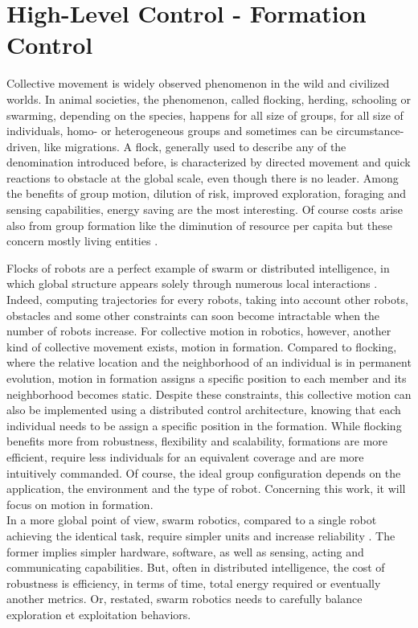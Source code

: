 \documentclass[a4paper, 12pt]{report}
\begin{document}
\section{High-Level Control - Formation Control}
Collective movement is widely observed phenomenon in the wild and civilized worlds. In animal societies, the phenomenon, called flocking, herding, schooling or swarming, depending on the species, happens for all size of groups, for all size of individuals, homo- or heterogeneous groups and sometimes can be circumstance-driven, like migrations. A flock, generally used to describe any of the denomination introduced before, is characterized by directed movement and quick reactions to obstacle at the global scale, even though there is no leader. Among the benefits of group motion, dilution of risk, improved exploration, foraging and sensing capabilities, energy saving are the most interesting. Of course costs arise also from group formation like the diminution of resource per capita but these concern mostly living entities \cite{Krause2002, Parrish1997}.

Flocks of robots are a perfect example of swarm or distributed intelligence, in which global structure appears solely through numerous local interactions \cite{Bonabeau1999, Reynolds1987}. Indeed, computing trajectories for every robots, taking into account other robots, obstacles and some other constraints can soon become intractable when the number of robots increase. For collective motion in robotics, however, another kind of collective movement exists, motion in formation. Compared to flocking, where the relative location and the neighborhood of an individual is in permanent evolution, motion in formation assigns a specific position to each member and its neighborhood becomes static. Despite these constraints, this collective motion can also be implemented using a distributed control architecture, knowing that each individual needs to be assign a specific position in the formation. While flocking benefits more from robustness, flexibility and scalability, formations are more efficient, require less individuals for an equivalent coverage and are more intuitively commanded. Of course, the ideal group configuration depends on the application, the environment and the type of robot. Concerning this work, it will focus on motion in formation.\\
In a more global point of view, swarm robotics, compared to a single robot achieving the identical task, require simpler units and increase reliability \cite{Beni2004}. The former implies simpler hardware, software, as well as sensing, acting and communicating capabilities. But, often in distributed intelligence, the cost of robustness is efficiency, in terms of time, total energy required or eventually another metrics. Or, restated, swarm robotics needs to carefully balance exploration et exploitation behaviors.
\end{document}
